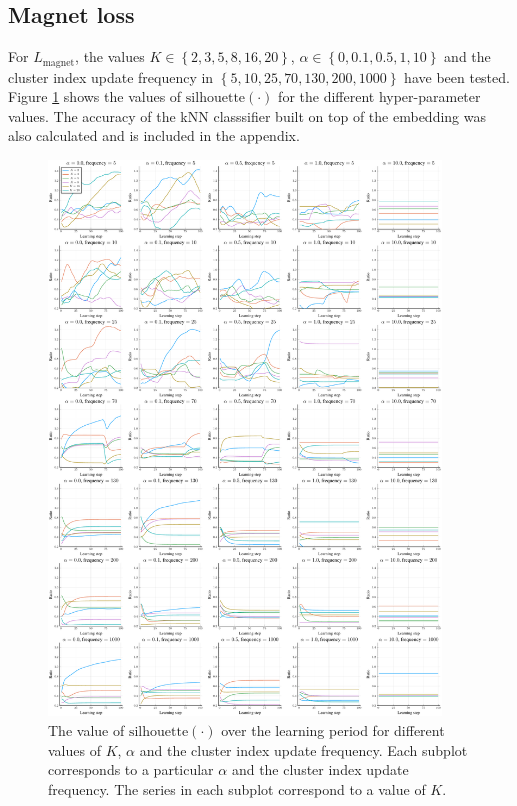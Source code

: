 \subsection{Magnet loss}
For \( L_\mathrm{magnet} \), the values \( K \in \left\{ 2, 3, 5, 8, 16, 20 \right\} \), \( \alpha \in \left\{ 0, 0.1, 0.5, 1, 10 \right\} \) and the cluster index update frequency in \( \left\{ 5, 10, 25, 70, 130, 200, 1000 \right\} \) have been tested. Figure \ref{fig:magnet-gridsearch-ratio} shows the values of \( \mathrm{silhouette} \left( \cdot \right) \) for the different hyper-parameter values. The accuracy of the kNN classsifier built on top of the embedding was also calculated and is included in the appendix.

\begin{figure}[H]
  \centering
  \includegraphics[width=0.93\textwidth]{images/magnet-gridsearch/ratio/K/magnet-gridsearch-ratio-K.pdf}
  \caption{The value of \( \mathrm{silhouette} \left( \cdot \right) \) over the learning period for different values of \( K \), \( \alpha \) and the cluster index update frequency. Each subplot corresponds to a particular \( \alpha \) and the cluster index update frequency. The series in each subplot correspond to a value of \( K \).}\label{fig:magnet-gridsearch-ratio}
\end{figure}

